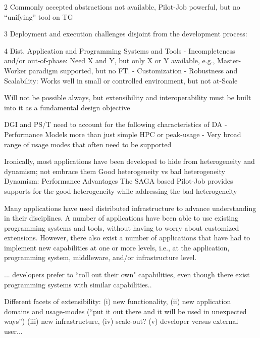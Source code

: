 \documentclass[conference,final]{IEEEtran}
\begin{document}
2 Commonly accepted abstractions not available, Pilot-Job powerful,
but no “unifying” tool on TG

3 Deployment and execution challenges disjoint from the development
process: 

4 Dist. Application and Programming Systems and Tools 
 - Incompleteness and/or out-of-phase:  Need X and Y, but only X or Y available, 
   e.g., Master-Worker paradigm supported, but no FT.
 - Customization
 - Robustness and Scalability: Works well in small or controlled
 environment, but not at-Scale

 Will not be possible always, but extensibility and interoperability
 must be built into it as a fundamental design objective

DGI and PS/T need to account for the following characteristics of DA
 - Performance Models more than just simple HPC or peak-usage
 - Very broad range of usage modes that often need to be supported

Ironically, most applications have been developed to hide from
heterogeneity and dynamism; not embrace them Good heterogeneity vs
bad heterogeneity Dynamism: Performance Advantages The SAGA based
Pilot-Job provides supports for the good heterogeneity while
addressing the bad heterogeneity

Many applications have used distributed infrastructure to advance
understanding in their disciplines. A number of applications have been
able to use existing programming systems and tools, without having to
worry about customized extensions. However, there also exist a number
of applications that have had to implement new capabilities at one or
more levels, i.e., at the application, programming system, middleware,
and/or infrastructure level.  

... developers prefer to ``roll out their own" capabilities, even
though there exist programming systems with similar capabilities..

Different facets of extensibility: (i) new functionality, (ii) new
application domains and usage-modes (``put it out there and it will be
used in unexpected ways'') (iii) new infrastructure, (iv) scale-out?
(v) developer versus external user...

\end{document}
